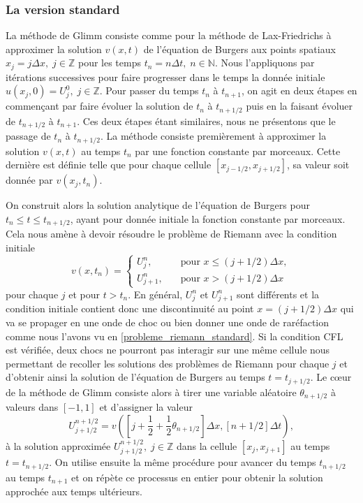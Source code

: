 \documentclass[11pt,a4paper]{article}
\begin{document}
\subsubsection{La version standard}

La méthode de Glimm consiste comme pour la méthode de Lax-Friedrichs à approximer la solution $v(x,t)$ de l'équation de Burgers aux points spatiaux $x_j = j\Delta x, \; j \in \mathbb{Z}$ pour les temps $t_n = n\Delta t,\; n\in \mathbb{N}$. %
Nous l'appliquons par itérations successives pour faire progresser dans le temps la donnée initiale $u(x_j,0) = U_j^0,\; j\in \mathbb{Z}$. Pour passer du temps $t_n$ à $t_{n+1}$, on agit en deux étapes en commençant par faire évoluer la solution de $t_n$ à $t_{n+1/2}$ puis en la faisant évoluer de $t_{n+1/2}$ à $t_{n+1}$. Ces deux étapes étant similaires, nous ne présentons que le passage de $t_{n}$ à $t_{n+1/2}$.  
La méthode consiste premièrement à approximer la solution $v(x,t)$ au temps $t_n$ par une fonction constante par morceaux. Cette dernière est définie telle que pour chaque cellule $[x_{j-1/2},x_{j+1/2}]$, sa valeur soit donnée par $v(x_j, t_n)$.

On construit alors la solution analytique de l'équation de Burgers pour $t_n \leq t \leq t_{n+1/2}$, ayant pour donnée initiale la fonction constante par morceaux. Cela nous amène à devoir résoudre le problème de Riemann avec la condition initiale
\begin{equation}
	v(x,t_n) = \left\{
	\begin{array}{rl}
	U_j^n, &\quad \text{pour } x\leq (j+1/2)\Delta x,\\
	U_{j+1}^n,&\quad \text{pour } x>(j+1/2) \Delta x
	\end{array}
	\right.
\end{equation}
pour chaque $j$ et pour $t>t_n$.
En général, $U_j^n$ et $U_{j+1}^n$ sont différents et la condition initiale contient donc une discontinuité au point $x = (j+1/2) \Delta x$ qui va se propager en une onde de choc ou bien donner une onde de raréfaction comme nous l'avons vu en \ref{probleme_riemann_standard}. Si la condition CFL est vérifiée, deux chocs ne pourront pas interagir sur une même cellule nous permettant de recoller les solutions des problèmes de Riemann pour chaque $j$ et d'obtenir ainsi la solution de l'équation de Burgers au temps $t = t_{j+1/2}$.
Le c\oe ur de la méthode de Glimm consiste alors à tirer une variable aléatoire $\theta_{n+1/2}$ à valeurs dans $[-1,1]$ et d'assigner la valeur
\begin{equation}
	U^{n+1/2}_{j+1/2} = v\left(\left[j+\frac{1}{2} + \frac{1}{2}\theta_{n+1/2}\right]\Delta x,\left[n+1/2\right]\Delta t\right),
\end{equation}
à la solution approximée $U^{n+1/2}_{j+1/2}, \; j\in \mathbb{Z}$ dans la cellule $[x_j, x_{j+1}]$ au temps $t=t_{n+1/2}$.
On utilise ensuite la même procédure pour avancer du temps $t_{n+1/2}$ au temps $t_{n+1}$ et on répète ce processus en entier pour obtenir la solution approchée aux temps ultérieurs.
\end{document}
